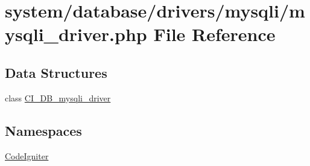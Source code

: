 \hypertarget{mysqli__driver_8php}{\section{system/database/drivers/mysqli/mysqli\-\_\-driver.php File Reference}
\label{mysqli__driver_8php}
}
\subsection*{Data Structures}
\begin{DoxyCompactItemize}
\item 
class \hyperlink{class_c_i___d_b__mysqli__driver}{C\-I\-\_\-\-D\-B\-\_\-mysqli\-\_\-driver}
\end{DoxyCompactItemize}
\subsection*{Namespaces}
\begin{DoxyCompactItemize}
\item 
\hyperlink{namespace_code_igniter}{Code\-Igniter}
\end{DoxyCompactItemize}

